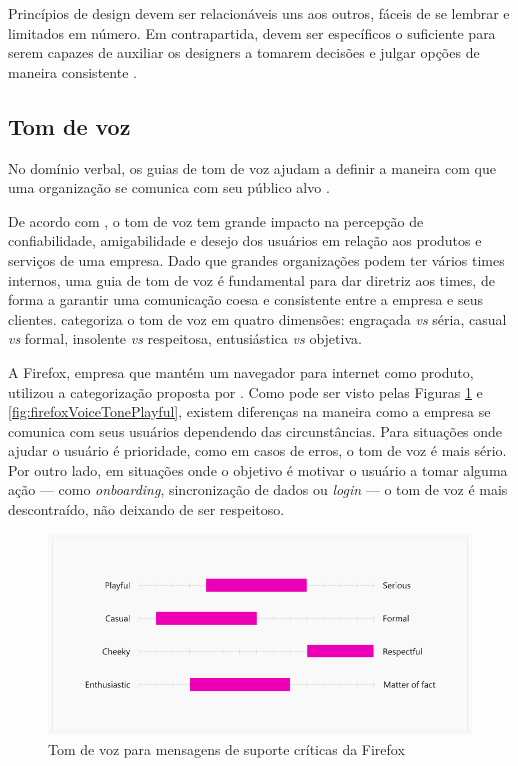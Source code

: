 Princípios de design devem ser relacionáveis uns aos outros, fáceis de se lembrar e limitados em número. Em contrapartida, devem ser específicos o suficiente para serem capazes de auxiliar os designers a tomarem decisões e julgar opções de maneira consistente \cite{kholmatova2017design}.

\subsection{Tom de voz}
\label{subsec:tomVoz}

No domínio verbal, os guias de tom de voz ajudam a definir a maneira com que uma organização se comunica com seu público alvo \cite{ruissalo2018operating}.

De acordo com , o tom de voz tem grande impacto na percepção de confiabilidade, amigabilidade e desejo dos usuários em relação aos produtos e serviços de uma empresa. Dado que grandes organizações podem ter vários times internos, uma guia de tom de voz é fundamental para dar diretriz aos times, de forma a garantir uma comunicação coesa e consistente entre a empresa e seus clientes.  categoriza o tom de voz em quatro dimensões: engraçada \textit{vs} séria, casual \textit{vs} formal, insolente \textit{vs} respeitosa, entusiástica \textit{vs} objetiva.

A Firefox, empresa que mantém um navegador para internet como produto, utilizou a categorização proposta por \cite{impactOfVoiceTone}. Como pode ser visto pelas Figuras \ref{fig:firefoxVoiceToneSerious} e \ref{fig:firefoxVoiceTonePlayful}, existem diferenças na maneira como a empresa se comunica com seus usuários dependendo das circunstâncias. Para situações onde ajudar o usuário é prioridade, como em casos de erros, o tom de voz é mais sério. Por outro lado, em situações onde o objetivo é motivar o usuário a tomar alguma ação --- como \textit{onboarding}, sincronização de dados ou \textit{login} --- o tom de voz é mais descontraído, não deixando de ser respeitoso.

\begin{figure}
	\includegraphics[width=\linewidth]{./04-figuras/02_referencial_teorico/firefox-tone-voice-01.png}
	\caption{Tom de voz para mensagens de suporte críticas da Firefox}
  \label{fig:firefoxVoiceToneSerious}
\end{figure}

